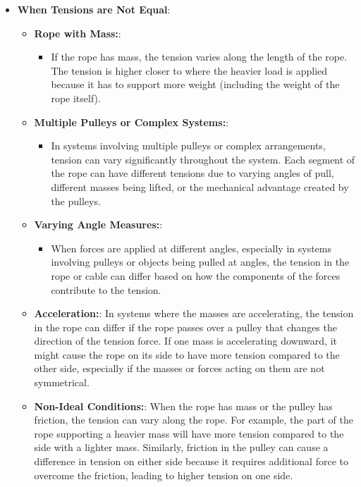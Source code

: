 \documentclass{report}
\begin{document}
\begin{itemize}
\begin{itemize}
            \end{itemize}
        \item \textbf{When Tensions are Not Equal}:
            \begin{itemize}
                \item \textbf{Rope with Mass:}:
                    \begin{itemize}
                        \item If the rope has mass, the tension varies along the length of the rope. The tension is higher closer to where the heavier load is applied because it has to support more weight (including the weight of the rope itself).
                    \end{itemize}
                \item \textbf{Multiple Pulleys or Complex Systems:}:
                    \begin{itemize}
                        \item In systems involving multiple pulleys or complex arrangements, tension can vary significantly throughout the system. Each segment of the rope can have different tensions due to varying angles of pull, different masses being lifted, or the mechanical advantage created by the pulleys. 
                    \end{itemize}
                \item \textbf{Varying Angle Measures:}:
                    \begin{itemize}
                        \item When forces are applied at different angles, especially in systems involving pulleys or objects being pulled at angles, the tension in the rope or cable can differ based on how the components of the forces contribute to the tension.
                    \end{itemize}
                \item \textbf{Acceleration:}: In systems where the masses are accelerating, the tension in the rope can differ if the rope passes over a pulley that changes the direction of the tension force. If one mass is accelerating downward, it might cause the rope on its side to have more tension compared to the other side, especially if the masses or forces acting on them are not symmetrical.
                \item \textbf{Non-Ideal Conditions:}: When the rope has mass or the pulley has friction, the tension can vary along the rope. For example, the part of the rope supporting a heavier mass will have more tension compared to the side with a lighter mass. Similarly, friction in the pulley can cause a difference in tension on either side because it requires additional force to overcome the friction, leading to higher tension on one side.

\end{itemize}
\end{itemize}
\end{document}
